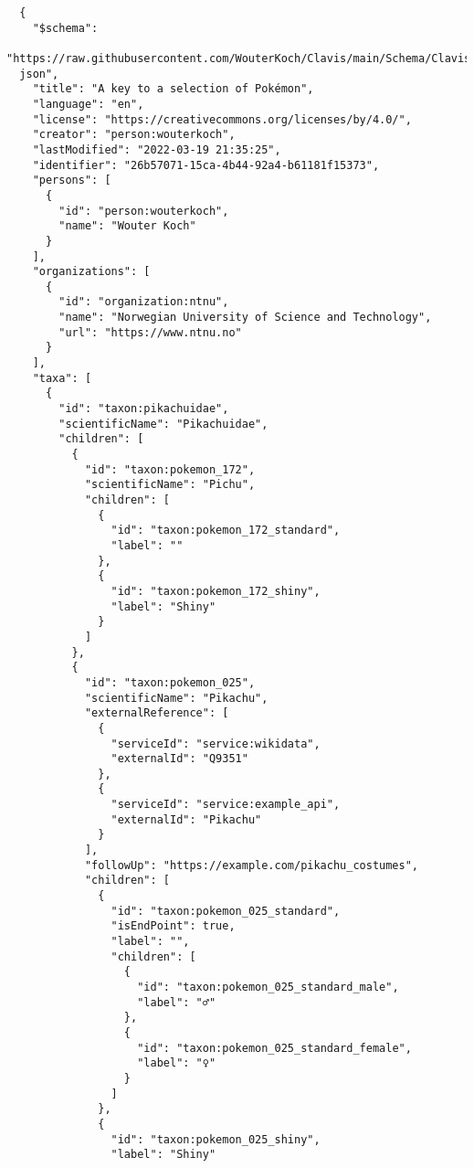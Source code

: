 \documentclass[10pt,letterpaper]{article}
\begin{document}
\vspace*{0.2in}

\begin{flushleft}
{\Large
\textbf{}}
\newline
\end{flushleft}
\linenumbers
\begin{verbatim}
  {
    "$schema":
  "https://raw.githubusercontent.com/WouterKoch/Clavis/main/Schema/Clavis.
  json",
    "title": "A key to a selection of Pokémon",
    "language": "en",
    "license": "https://creativecommons.org/licenses/by/4.0/",
    "creator": "person:wouterkoch",
    "lastModified": "2022-03-19 21:35:25",
    "identifier": "26b57071-15ca-4b44-92a4-b61181f15373",
    "persons": [
      {
        "id": "person:wouterkoch",
        "name": "Wouter Koch"
      }
    ],
    "organizations": [
      {
        "id": "organization:ntnu",
        "name": "Norwegian University of Science and Technology",
        "url": "https://www.ntnu.no"
      }
    ],
    "taxa": [
      {
        "id": "taxon:pikachuidae",
        "scientificName": "Pikachuidae",
        "children": [
          {
            "id": "taxon:pokemon_172",
            "scientificName": "Pichu",
            "children": [
              {
                "id": "taxon:pokemon_172_standard",
                "label": ""
              },
              {
                "id": "taxon:pokemon_172_shiny",
                "label": "Shiny"
              }
            ]
          },
          {
            "id": "taxon:pokemon_025",
            "scientificName": "Pikachu",
            "externalReference": [
              {
                "serviceId": "service:wikidata",
                "externalId": "Q9351"
              },
              {
                "serviceId": "service:example_api",
                "externalId": "Pikachu"
              }
            ],
            "followUp": "https://example.com/pikachu_costumes",
            "children": [
              {
                "id": "taxon:pokemon_025_standard",
                "isEndPoint": true,
                "label": "",
                "children": [
                  {
                    "id": "taxon:pokemon_025_standard_male",
                    "label": "♂"
                  },
                  {
                    "id": "taxon:pokemon_025_standard_female",
                    "label": "♀"
                  }
                ]
              },
              {
                "id": "taxon:pokemon_025_shiny",
                "label": "Shiny"

\end{verbatim}
\end{document}
